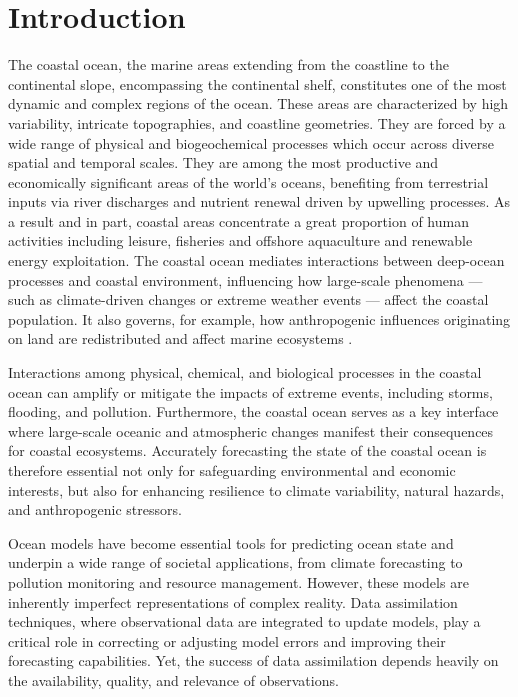 \section{Introduction}
\label{sec:intro}

The coastal ocean, the marine areas extending from the coastline to
the continental slope, encompassing the continental shelf, constitutes
one of the most dynamic and complex regions of the ocean. These areas
are characterized by high variability, intricate topographies, and
coastline geometries. They are forced by a wide range of physical and
biogeochemical processes which occur across diverse spatial and
temporal scales. They are among the most productive and economically
significant areas of the world’s oceans, benefiting from
terrestrial inputs via river discharges and nutrient renewal driven by
upwelling processes. As a result and in part, coastal areas
concentrate a great proportion of human activities including leisure,
fisheries and offshore aquaculture and renewable energy
exploitation. The coastal ocean mediates interactions between
deep-ocean processes and coastal environment, influencing how
large-scale phenomena — such as climate-driven changes or extreme
weather events — affect the coastal population. It also governs, for
example, how anthropogenic influences originating on land are
redistributed and affect marine ecosystems \parencite{greene25}.

Interactions among physical, chemical, and biological processes in the
coastal ocean can amplify or mitigate the impacts of extreme events,
including storms, flooding, and pollution. Furthermore, the coastal
ocean serves as a key interface where large-scale oceanic and
atmospheric changes manifest their consequences for coastal
ecosystems. Accurately forecasting the state of the coastal ocean is
therefore essential not only for safeguarding environmental and
economic interests, but also for enhancing resilience to climate
variability, natural hazards, and anthropogenic stressors.

Ocean models have become essential tools for predicting ocean state
and underpin a wide range of societal applications, from climate
forecasting to pollution monitoring and resource management. However,
these models are inherently imperfect representations of complex
reality. Data assimilation techniques, where observational data are
integrated to update models, play a critical role in correcting or
adjusting model errors and improving their forecasting
capabilities. Yet, the success of data assimilation depends heavily on
the availability, quality, and relevance of observations.

